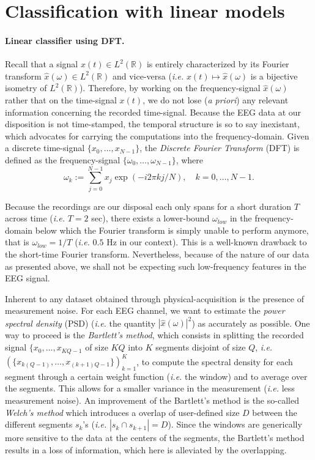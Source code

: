 \section{Classification with linear models}

\paragraph{Linear classifier using DFT. } Recall that a signal $x(t) \in L^2(\mathbb{R})$ is entirely characterized by its Fourier transform $\widehat{x}(\omega) \in L^2(\mathbb{R})$ and vice-versa (\emph{i.e.} $x(t) \mapsto \widehat{x}(\omega)$ is a bijective isometry of $L^2(\mathbb{R})$). Therefore, by working on the frequency-signal $\widehat{x}(\omega)$ rather that on the time-signal $x(t)$, we do not lose (\emph{a priori}) any relevant information concerning the recorded time-signal. Because the EEG data at our disposition is not time-stamped, the temporal structure is so to say inexistant, which advocates for carrying the computations into the frequency-domain. Given a discrete time-signal $\{x_0, \dots, x_{N-1} \}$, the \emph{Discrete Fourier Transform} (DFT) is defined as the frequency-signal $\{\omega_0, \dots, \omega_{N-1}\}$, where
$$
\omega_k := \sum_{j = 0}^{N-1} x_j \exp( - i 2 \pi kj/N), \quad k = 0, \dots, N-1. 
$$


Because the recordings are our disposal each only spans for a short duration $T$ across time (\emph{i.e.} $T = 2$ sec), there exists a lower-bound $\omega_{low}$ in the frequency-domain below which the Fourier transform is simply unable to perform anymore, that is $\omega_{low} = 1/T$ (\emph{i.e.} $0.5$ Hz in our context). This is a well-known drawback to the short-time Fourier transform. Nevertheless, because of the nature of our data as presented above, we shall not be expecting such low-frequency features in the EEG signal.

Inherent to any dataset obtained through physical-acquisition is the presence of measurement noise. For each EEG channel, we want to estimate the \emph{power spectral density} (PSD) (\emph{i.e.} the quantity $| \widehat{x}(\omega)|^2$) as accurately as possible. One way to proceed is the \emph{Bartlett's method}, which consists in splitting the recorded signal $\{x_0, \dots, x_{KQ - 1}$ of size $KQ$ into $K$ segments disjoint of size $Q$, \emph{i.e.} $(\{x_{k(Q - 1)}, \dots, x_{(k+1)Q - 1}\})_{k=1}^K$, to compute the spectral density for each segment through a certain weight function (\emph{i.e.} the window) and to average over the segments. This allows for a smaller variance in the measurement (\emph{i.e.} less measurement noise). An improvement of the Bartlett's method is the so-called \emph{Welch's method} which introduces a overlap of user-defined size $D$ between the different segments $s_k$'s (\emph{i.e.} $|s_k \cap s_{k+1}| = D$). Since the windows are generically more sensitive to the data at the centers of the segments, the Bartlett's method results in a loss of information, which here is alleviated by the overlapping. 


